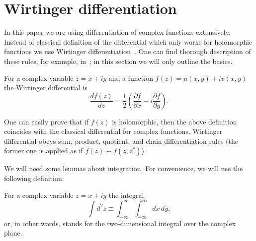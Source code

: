 \section{Wirtinger differentiation}

In this paper we are using differentiation of complex functions extensively.
Instead of classical definition of the differential which only works for holomorphic functions we use Wirtinger differentiation~\cite{Wirtinger1927}.
One can find thorough description of these rules, for example, in~\cite{Kreutz-Delgado2009}; in this section we will only outline the basics.

\begin{definition}
	For a complex variable $z = x + iy$ and a function $f(z) = u(x, y) + iv(x, y)$ the Wirtinger differential is
	\begin{equation*}
		\frac{df(z)}{dz}
		= \frac{1}{2} \left(
			\frac{\partial f}{\partial x} - i \frac{\partial f}{\partial y}
		\right).
	\end{equation*}
\end{definition}

One can easily prove that if $f(z)$ is holomorphic, then the above definition coincides with the classical differential for complex functions.
Wirtinger differential obeys sum, product, quotient, and chain differentiation rules (the former one is applied as if $f(z) \equiv f(z, z^*)$).

We will need some lemmas about integration.
For convenience, we will use the following definition:

\begin{definition}
	For a complex variable $z = x + iy$ the integral
	\begin{equation*}
		\int d^2 z \equiv \int_{-\infty}^{\infty} \int_{-\infty}^{\infty} dx\, dy,
	\end{equation*}
	or, in other words, stands for the two-dimensional integral over the complex plane.
\end{definition}

